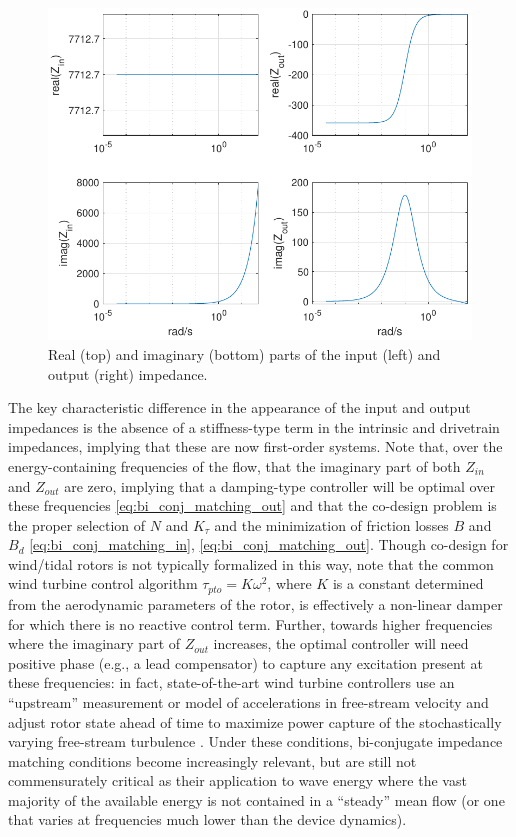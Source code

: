 \documentclass[lettersize,journal]{IEEEtran}
\begin{document}
{\begin{table}[tb]
\begin{tabular}{rc}
                \hline
        \end{tabular}
\end{table}

\begin{figure}
        \centering \includegraphics[width=\columnwidth]{RotorZinZout.pdf}
        \caption{Real (top) and imaginary (bottom) parts of the input (left) and output (right) impedance.}
        \label{fig: RotorZinZout}
\end{figure}

The key characteristic difference in the appearance of the input and output impedances is the absence of a stiffness-type term in the intrinsic and drivetrain impedances, implying that these are now first-order systems.
Note that, over the energy-containing frequencies of the flow, that the imaginary part of both $Z_{in}$ and $Z_{out}$ are zero, implying that a damping-type controller will be optimal over these frequencies \eqref{eq:bi_conj_matching_out} and that the co-design problem is the proper selection of $N$ and $K_\tau$ and the minimization of friction losses $B$ and $B_d$ \eqref{eq:bi_conj_matching_in}, \eqref{eq:bi_conj_matching_out}.
Though co-design for wind/tidal rotors is not typically formalized in this way, note that the common wind turbine control algorithm $\tau_{pto} = K\omega^2$, where $K$ is a constant determined from the aerodynamic parameters of the rotor, is effectively a non-linear damper for which there is no reactive control term.
Further, towards higher frequencies where the imaginary part of $Z_{out}$ increases, the optimal controller will need positive phase (e.g., a lead compensator) to capture any excitation present at these frequencies: in fact, state-of-the-art wind turbine controllers use an ``upstream'' measurement or model of accelerations in free-stream velocity and adjust rotor state ahead of time to maximize power capture of the stochastically varying free-stream turbulence \cite{Schlipf2013b}.
Under these conditions, bi-conjugate impedance matching conditions become increasingly relevant, but are still not commensurately critical as their application to wave energy where the vast majority of the available energy is not contained in a ``steady'' mean flow (or one that varies at frequencies much lower than the device dynamics).

}
\end{document}
